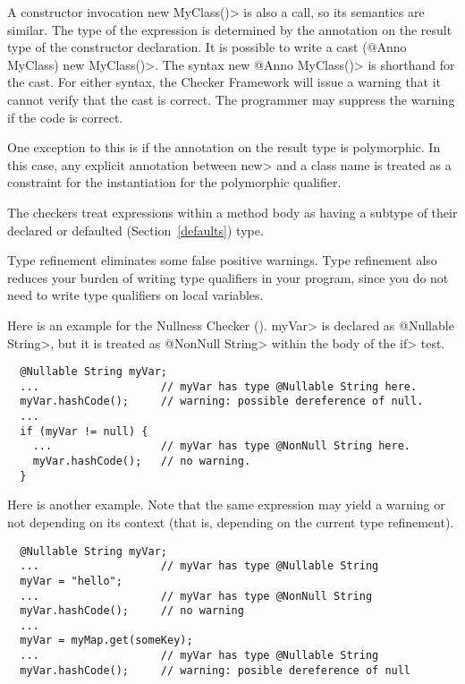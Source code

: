 A constructor invocation \<new MyClass()> is also a call, so its semantics
are similar.  The type of the expression is determined by the annotation on
the result type of the constructor declaration.  It is possible to write a cast
\<(@Anno MyClass) new MyClass()>.  The syntax \<new @Anno MyClass()> is shorthand
for the cast.  For either syntax, the Checker Framework will issue a
warning that it cannot verify that the cast is correct.  The programmer may
suppress the warning if the code is correct.

One exception to this is if the annotation on the result type is polymorphic.  In this case, any
explicit annotation between \<new> and a class name is treated as a constraint for the instantiation
for the polymorphic qualifier.


The
checkers treat expressions within a method body as having a
subtype of their declared or defaulted (Section~\ref{defaults})
type.

Type refinement eliminates some false positive warnings.
Type refinement also
reduces your burden of writing type qualifiers in your program,
since you do not need to write type qualifiers on local variables.



Here is an example for the Nullness Checker
().
\<myVar> is declared as \<@Nullable String>, but
it is treated as \<@NonNull String> within the body of the \<if> test.

\begin{Verbatim}
  @Nullable String myVar;
  ...                   // myVar has type @Nullable String here.
  myVar.hashCode();     // warning: possible dereference of null.
  ...
  if (myVar != null) {
    ...                 // myVar has type @NonNull String here.
    myVar.hashCode();   // no warning.
  }
\end{Verbatim}

Here is another example.
Note that the same expression may yield a
warning or not depending on its context (that is, depending on the current
type refinement).

\begin{Verbatim}
  @Nullable String myVar;
  ...                   // myVar has type @Nullable String
  myVar = "hello";
  ...                   // myVar has type @NonNull String
  myVar.hashCode();     // no warning
  ...
  myVar = myMap.get(someKey);
  ...                   // myVar has type @Nullable String
  myVar.hashCode();     // warning: posible dereference of null
\end{Verbatim}

